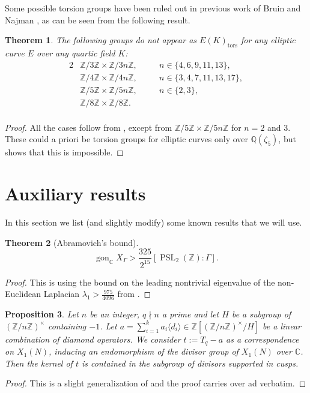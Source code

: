 \documentclass[11pt,reqno]{amsart}
\DeclareMathOperator{\PSL}{PSL}
\DeclareMathOperator{\gon}{gon}
\newtheorem{theorem}{Theorem}[section]
\newtheorem{proposition}[theorem]{Proposition}
\theoremstyle{definition}
\numberwithin{equation}{section}
\newcommand{\Q}{\mathbb{Q}}
\newcommand{\Z}{\mathbb{Z}}
\newcommand{\C}{\mathbb{C}}
\newcommand{\tor}{\mathrm{tors}}
\def\tg#1#2{\mathbb Z/#1\mathbb Z \times \mathbb Z /#2 \mathbb Z}
\newcommand{\diamondop}[1]{\langle #1 \rangle} %
\begin{document}
Some possible torsion groups have been ruled out in previous work of Bruin and Najman \cite{bruin_najman2016}, as can be seen from the following result.

\begin{theorem} \label{thm:BN}
  The following groups do not appear as $E(K)_{\tor}$ for any elliptic curve $E$ over any quartic field $K$:
\begin{alignat*}{2}
& \tg{3}{3n}, \quad && n\in \{4,6,9,11,13\}, \\
& \tg{4}{4n}, \quad && n\in \{3,4,7,11,13,17\}, \\
& \tg{5}{5n}, \quad && n\in \{2,3\}, \\
& \tg{8}{8}. \quad && \\
\end{alignat*}
\end{theorem}
\begin{proof}
    All the cases follow from {\cite[Theorem 8]{bruin_najman2016}}, except from $\tg{5}{5n}$ for $n=2$ and $3.$ These could a priori be torsion groups for elliptic curves only over $\Q(\zeta_5)$, but {\cite[Theorem 6]{bruin_najman2016}} shows that this is impossible.
\end{proof}




\section{Auxiliary results}
In this section we list (and slightly modify) some known results that we will use. 

\begin{theorem}[Abramovich's bound]
\label{abramovich}
    $$\gon_\C X_\Gamma>\frac{325}{2^{15}}[\PSL_2(\Z): \Gamma].$$
\end{theorem}
\begin{proof}
    This is \cite[Theorem 0.1]{abramovich} using the bound on the leading nontrivial eigenvalue of the non-Euclidean Laplacian $\lambda_1>\frac{975}{4096}$ from \cite[Appendix 2]{Kim03}.
\end{proof}

\begin{proposition}\label{prop:hecke-kernel}
Let $n$ be an integer, $q \nmid n$ a prime and let $H$ be a subgroup
  of~$(\Z/n\Z)^\times$ containing $-1$. Let $a=\sum_{i=1}^k a_i\diamondop{d_i} \in \Z[(\Z/n\Z)^\times/H]$ be a linear combination of diamond operators. We consider $t :=T_q - a$ 
as a correspondence on $X_1(N)$, inducing an endomorphism of the divisor group of $X_1(N)$
over $\C$. Then the kernel of $t$ is contained in the subgroup of divisors supported in cusps.
\end{proposition}
\begin{proof}
This is a slight generalization of \cite[Proposition 2.4]{DKSS} and the proof carries over ad verbatim.
\end{proof}
\end{document}

